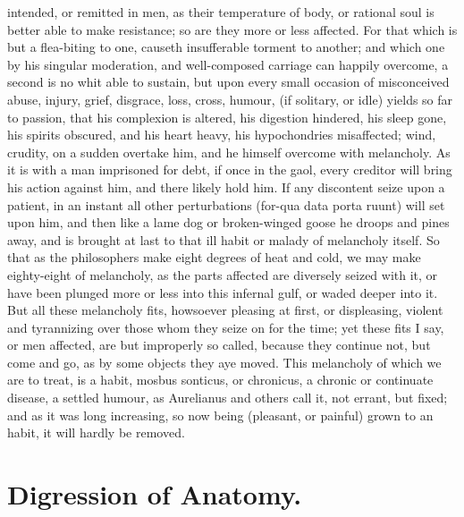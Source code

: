 {intended, or remitted in men, as their temperature of body, or rational
soul is better able to make resistance; so are they more or less
affected. For that which is but a flea-biting to one, causeth
insufferable torment to another; and which one by his singular
moderation, and well-composed carriage can happily overcome, a second
is no whit able to sustain, but upon every small occasion of
misconceived abuse, injury, grief, disgrace, loss, cross, humour, \etc{}
(if solitary, or idle) yields so far to passion, that his complexion is
altered, his digestion hindered, his sleep gone, his spirits obscured,
and his heart heavy, his hypochondries misaffected; wind, crudity, on a
sudden overtake him, and he himself overcome with melancholy. As it is
with a man imprisoned for debt, if once in the gaol, every creditor
will bring his action against him, and there likely hold him. If any
discontent seize upon a patient, in an instant all other perturbations
(for-qua data porta ruunt) will set upon him, and then like a lame dog
or broken-winged goose he droops and pines away, and is brought at last
to that ill habit or malady of melancholy itself. So that as the
philosophers make eight degrees of heat and cold, we may make
eighty-eight of melancholy, as the parts affected are diversely seized
with it, or have been plunged more or less into this infernal gulf, or
waded deeper into it. But all these melancholy fits, howsoever pleasing
at first, or displeasing, violent and tyrannizing over those whom they
seize on for the time; yet these fits I say, or men affected, are but
improperly so called, because they continue not, but come and go, as by
some objects they aye moved. This melancholy of which we are to treat,
is a habit, mosbus sonticus, or chronicus, a chronic or continuate
disease, a settled humour, as Aurelianus and others call it,
not errant, but fixed; and as it was long increasing, so now being
(pleasant, or painful) grown to an habit, it will hardly be removed.


\section{Digression of Anatomy.}

}
